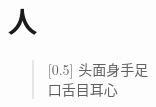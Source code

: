 \documentclass[12pt,UTF-8,openany]{ctexbook}
\begin{document}
\hanzibox{}\hanzibox{}\hanzibox{}\hanzibox{}\hspace{1em}\hanzibox{}\hanzibox{}\hanzibox{}\hanzibox{}

\hanzibox{}\hanzibox{}\hanzibox{}\hanzibox{}\hspace{1em}\hanzibox{}\hanzibox{}\hanzibox{}\hanzibox{}

\hanzibox{}\hanzibox{}\hanzibox{}\hanzibox{}\hspace{1em}\hanzibox{}\hanzibox{}\hanzibox{}\hanzibox{}

\hanzibox{}\hanzibox{}\hanzibox{}\hanzibox{}\hspace{1em}\hanzibox{}\hanzibox{}\hanzibox{}\hanzibox{}

\hanzibox{}\hanzibox{}\hanzibox{}\hanzibox{}\hspace{1em}\hanzibox{}\hanzibox{}\hanzibox{}\hanzibox{}

\hanzibox{}\hanzibox{}\hanzibox{}\hanzibox{}\hspace{1em}\hanzibox{}\hanzibox{}\hanzibox{}\hanzibox{}

\hanzibox{}\hanzibox{}\hanzibox{}\hanzibox{}\hspace{1em}\hanzibox{}\hanzibox{}\hanzibox{}\hanzibox{}

\hanzibox{}\hanzibox{}\hanzibox{}\hanzibox{}\hspace{1em}




\chapter{人}

\begin{large}
    
    \begin{verse}[0.5\linewidth]
        头面身手足 \\
        口舌目耳心
    \end{verse}
    
\end{large}


\clearpage

\begin{center}
    
    
\end{center}
\end{document}
